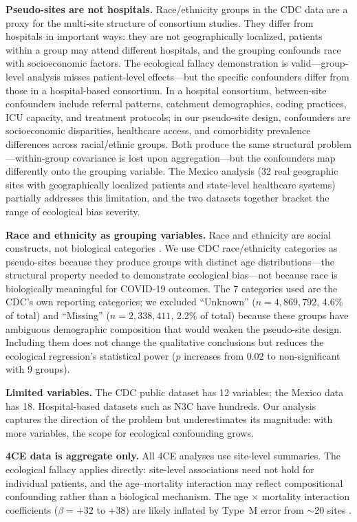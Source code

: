 \documentclass[11pt]{article}
\begin{document}
\textbf{Pseudo-sites are not hospitals.}  Race/ethnicity groups in the CDC
data are a proxy for the multi-site structure of consortium studies.  They
differ from hospitals in important ways: they are not geographically
localized, patients within a group may attend different hospitals, and the
grouping confounds race with socioeconomic factors.  The ecological fallacy
demonstration is valid---group-level analysis misses patient-level
effects---but the specific confounders differ from those in a hospital-based
consortium.  In a hospital consortium, between-site confounders include
referral patterns, catchment demographics, coding practices, ICU capacity,
and treatment protocols; in our pseudo-site design, confounders are
socioeconomic disparities, healthcare access, and comorbidity prevalence
differences across racial/ethnic groups.  Both produce the same structural
problem---within-group covariance is lost upon aggregation---but the
confounders map differently onto the grouping variable.  The Mexico
analysis (32 real geographic sites with geographically localized patients
and state-level healthcare systems) partially addresses this limitation,
and the two datasets together bracket the range of ecological bias severity.

\textbf{Race and ethnicity as grouping variables.}  Race and ethnicity are
social constructs, not biological categories \cite{subramanian2009revisiting}.
We use CDC race/ethnicity categories as pseudo-sites because they produce
groups with distinct age distributions---the structural property needed to
demonstrate ecological bias---not because race is biologically meaningful
for COVID-19 outcomes.  The 7 categories used are the CDC's own reporting
categories; we excluded ``Unknown'' ($n = 4{,}869{,}792$, 4.6\% of total)
and ``Missing'' ($n = 2{,}338{,}411$, 2.2\% of total) because these groups
have ambiguous demographic composition that would weaken the pseudo-site
design.  Including them does not change the qualitative conclusions but
reduces the ecological regression's statistical power ($p$ increases from
0.02 to non-significant with 9 groups).

\textbf{Limited variables.}  The CDC public dataset has 12 variables; the
Mexico data has 18.  Hospital-based datasets such as N3C have hundreds.
Our analysis captures the direction of the problem but underestimates its
magnitude: with more variables, the scope for ecological confounding grows.

\textbf{4CE data is aggregate only.}  All 4CE analyses use site-level
summaries.  The ecological fallacy applies directly: site-level associations
need not hold for individual patients, and the age--mortality interaction may
reflect compositional confounding rather than a biological mechanism.  The
age $\times$ mortality interaction coefficients ($\beta = +32$ to $+38$) are
likely inflated by Type~M error from $\sim$20 sites
\cite{gelman2014typeMS}.
\end{document}
